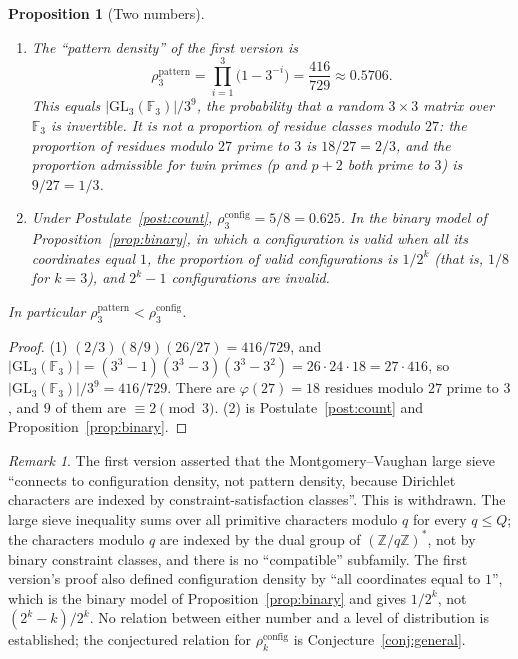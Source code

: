 \documentclass[12pt]{amsart}
\theoremstyle{plain}
\newtheorem{proposition}[theorem]{Proposition}
\theoremstyle{definition}
\theoremstyle{remark}
\newtheorem{remark}[theorem]{Remark}
\newcommand{\Z}{\mathbb{Z}}
\newcommand{\rhoc}{\rho^{\mathrm{config}}}
\newcommand{\rhop}{\rho^{\mathrm{pattern}}}
\begin{document}
\begin{proposition}[Two numbers]
\label{prop:two-densities}
\begin{enumerate}[label=(\arabic*)]
  \item The ``pattern density'' of the first version is
    \[
      \rhop_3 = \prod_{i=1}^{3}\!\bigl(1 - 3^{-i}\bigr) = \frac{416}{729}
      \approx 0.5706.
    \]
    This equals $|\mathrm{GL}_3(\mathbb{F}_3)|/3^9$, the probability that a
    random $3 \times 3$ matrix over $\mathbb{F}_3$ is invertible. It is not a
    proportion of residue classes modulo $27$: the proportion of residues
    modulo $27$ prime to $3$ is $18/27 = 2/3$, and the proportion admissible for
    twin primes ($p$ and $p+2$ both prime to $3$) is $9/27 = 1/3$.
  \item Under Postulate~\ref{post:count}, $\rhoc_3 = 5/8 = 0.625$. In the binary
    model of Proposition~\ref{prop:binary}, in which a configuration is valid
    when all its coordinates equal $1$, the proportion of valid configurations
    is $1/2^k$ (that is, $1/8$ for $k = 3$), and $2^k - 1$ configurations are
    invalid.
\end{enumerate}
In particular $\rhop_3 < \rhoc_3$.
\end{proposition}

\begin{proof}
(1) $(2/3)(8/9)(26/27) = 416/729$, and
$|\mathrm{GL}_3(\mathbb{F}_3)| = (3^3-1)(3^3-3)(3^3-3^2) = 26 \cdot 24 \cdot 18
= 27 \cdot 416$, so $|\mathrm{GL}_3(\mathbb{F}_3)|/3^9 = 416/729$. There are
$\varphi(27) = 18$ residues modulo $27$ prime to $3$, and $9$ of them are
$\equiv 2 \pmod{3}$. (2) is Postulate~\ref{post:count} and
Proposition~\ref{prop:binary}.
\end{proof}

\begin{remark}
\label{rem:largesieve}
The first version asserted that the Montgomery--Vaughan large
sieve~\cite{MV1973} ``connects to configuration density, not pattern density,
because Dirichlet characters are indexed by constraint-satisfaction classes''.
This is withdrawn. The large sieve inequality sums over all primitive characters
modulo $q$ for every $q \leq Q$; the characters modulo $q$ are indexed by the
dual group of $(\Z/q\Z)^*$, not by binary constraint classes, and there is no
``compatible'' subfamily. The first version's proof also defined configuration
density by ``all coordinates equal to $1$'', which is the binary model of
Proposition~\ref{prop:binary} and gives $1/2^k$, not $(2^k - k)/2^k$. No relation
between either number and a level of distribution is established; the
conjectured relation for $\rhoc_k$ is Conjecture~\ref{conj:general}.
\end{remark}
\end{document}
